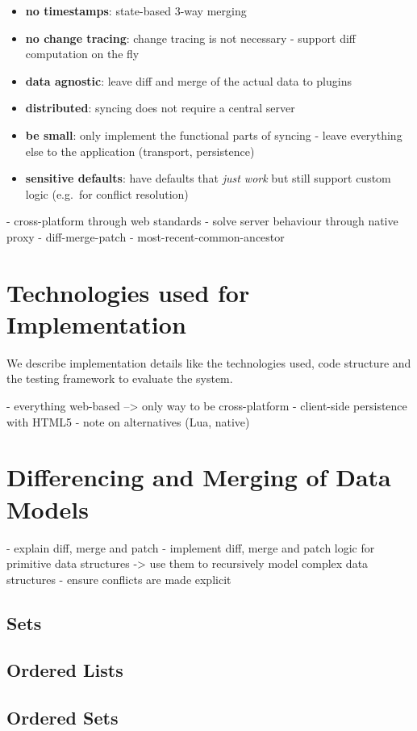 \begin{itemize}
\item
  \textbf{no timestamps}: state-based 3-way merging
\item
  \textbf{no change tracing}: change tracing is not necessary - support
  diff computation on the fly
\item
  \textbf{data agnostic}: leave diff and merge of the actual data to
  plugins
\item
  \textbf{distributed}: syncing does not require a central server
\item
  \textbf{be small}: only implement the functional parts of syncing -
  leave everything else to the application (transport, persistence)
\item
  \textbf{sensitive defaults}: have defaults that \emph{just work} but
  still support custom logic (e.g.~for conflict resolution)
\end{itemize}

- cross-platform through web standards
- solve server behaviour through native proxy
- diff-merge-patch
- most-recent-common-ancestor

\section{Technologies used for Implementation}
We describe implementation details like the technologies used, code structure and the testing framework to evaluate the system.

- everything web-based --> only way to be cross-platform
- client-side persistence with HTML5
- note on alternatives (Lua, native)

\section{Differencing and Merging of Data Models}
- explain diff, merge and patch
- implement diff, merge and patch logic for primitive data structures
  -> use them to recursively model complex data structures
- ensure conflicts are made explicit

\subsection{Sets}
\subsection{Ordered Lists}
\subsection{Ordered Sets}
